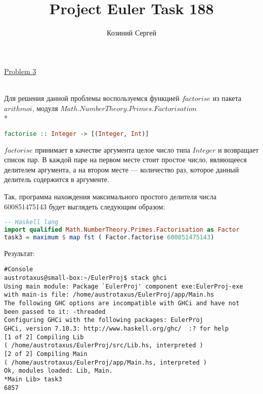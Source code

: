 \documentclass[11pt,a4paper]{article}
\title{Project Euler Task 188}
\author{Козиний Сергей}
\begin{document}
    
\maketitle
\href{''https://projecteuler.net/problem=3''}{Problem 3}

\\



Для решения данной  проблемы воспользуемся функцией $factorise$ из пакета $arithmoi$, модуля $Math.NumberTheory.Primes.Factorisation $   \\*
\begin{lstlisting}[language=Haskell]
factorise :: Integer -> [(Integer, Int)]
\end{lstlisting}

$factorise$ принимает в качестве аргумента целое число типа $Integer$ и возвращает список пар. В каждой паре на первом месте стоит простое число, являющееся делителем аргумента, а на втором месте --- количество раз, которое данный делитель содержится в аргументе. 

Так, программа нахождения максимального простого делителя числа 600851475143 будет выглядеть следующим образом:
\begin{lstlisting}[language=Haskell]
-- Haskell lang
import qualified Math.NumberTheory.Primes.Factorisation as Factor
task3 = maximum $ map fst ( Factor.factorise 600851475143)

\end{lstlisting}

Результат:
\begin{lstlisting}
#Console
austrotaxus@small-box:~/EulerProj$ stack ghci
Using main module: Package `EulerProj' component exe:EulerProj-exe
with main-is file: /home/austrotaxus/EulerProj/app/Main.hs
The following GHC options are incompatible with GHCi and have not
been passed to it: -threaded
Configuring GHCi with the following packages: EulerProj
GHCi, version 7.10.3: http://www.haskell.org/ghc/  :? for help
[1 of 2] Compiling Lib
( /home/austrotaxus/EulerProj/src/Lib.hs, interpreted )
[2 of 2] Compiling Main
( /home/austrotaxus/EulerProj/app/Main.hs, interpreted )
Ok, modules loaded: Lib, Main. 
*Main Lib> task3
6857
\end{lstlisting}
\end{document}
